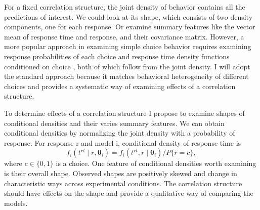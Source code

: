 \documentclass[12pt]{report}
\begin{document}
For a fixed correlation structure, the joint density of behavior contains all the predictions of interest. We could look at its shape, which consists of two density components, one for each response. Or examine summary features like the vector mean of response time and response, and their covariance matrix. However, a more popular approach in examining simple choice behavior requires examining response probabilities of each choice and response time density functions conditioned on choice \citep{Vic1979,Luc1986}, both of which follow from the joint density. I will adopt the standard approach because it matches behavioral heterogeneity of different choices  and provides a systematic way of examining effects of a correlation structure. 

To determine effects of a correlation structure I propose to examine shapes of conditional densities and their varies summary features. We can obtain conditional densities by normalizing the joint density with a probability of response. For response r and model i, conditional density of response time is
\begin{equation}
f_i(t^{rt} \mid r, \boldsymbol{\theta}_i) = f_i(t^{rt}, r \mid \boldsymbol{\theta}_i) / P\{r = c\},
\end{equation}
where $c \in \{0, 1\}$ is a choice.
One feature of conditional densities worth examining is their overall shape. Observed shapes are positively skewed and change in characteristic ways across experimental conditions. The correlation structure should have effects on the shape and provide a qualitative way of comparing the models.
\end{document}
